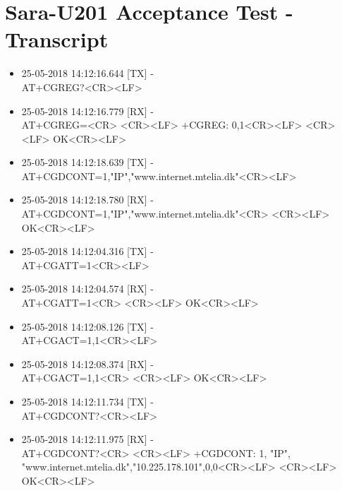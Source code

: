 \chapter{Sara-U201 Acceptance Test - Transcript}
\label{app:GSMcomm}
\begin{itemize}
	\item 25-05-2018 14:12:16.644 [TX] -\\ AT+CGREG?<CR><LF>
	\item 25-05-2018 14:12:16.779 [RX] -\\
	AT+CGREG=<CR> \newline <CR><LF> \newline +CGREG: 0,1<CR><LF> \newline <CR><LF> \newline OK<CR><LF>
	\item 25-05-2018 14:12:18.639 [TX] -\\
	AT+CGDCONT=1,"IP","www.internet.mtelia.dk"<CR><LF>
	\item 25-05-2018 14:12:18.780 [RX] -\\
	AT+CGDCONT=1,"IP","www.internet.mtelia.dk"<CR> \newline <CR><LF> \newline OK<CR><LF>
	\item 25-05-2018 14:12:04.316 [TX] -\\
	AT+CGATT=1<CR><LF>
	\item 25-05-2018 14:12:04.574 [RX] -\\
	AT+CGATT=1<CR> \newline <CR><LF> \newline OK<CR><LF>
	\item 25-05-2018 14:12:08.126 [TX] -\\
	AT+CGACT=1,1<CR><LF>
	\item 25-05-2018 14:12:08.374 [RX] -\\
	AT+CGACT=1,1<CR> \newline <CR><LF> \newline OK<CR><LF>
	\item 25-05-2018 14:12:11.734 [TX] -\\
	AT+CGDCONT?<CR><LF>
	\item 25-05-2018 14:12:11.975 [RX] -\\
	AT+CGDCONT?<CR> \newline <CR><LF> \newline +CGDCONT: 1, "IP", "www.internet.mtelia.dk","10.225.178.101",0,0<CR><LF> \newline <CR><LF> \newline OK<CR><LF>

\end{itemize}
